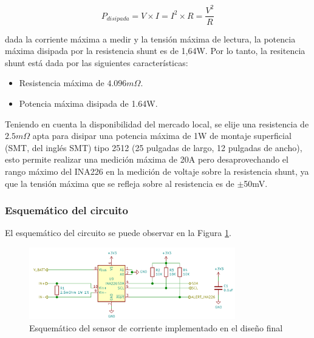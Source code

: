 \documentclass[10pt,a4paper]{article}
\begin{document}
\begin{itemize}
\begin{equation}
    P_{disipada} = V \times I = I^2 \times R = \frac{V^2}{R} \label{calc_pot_res}
\end{equation}

dada la corriente m\'axima a medir y la tensi\'on m\'axima de lectura, la
potencia m\'axima disipada por la resistencia shunt es de 1,64W. Por lo tanto,
la resitencia shunt est\'a dada por las siguientes caracter\'isticas:

\begin{itemize}
    \item Resistencia m\'axima de $4.096m\Omega$.
    \item Potencia m\'axima disipada de 1.64W.
\end{itemize}

Teniendo en cuenta la disponibilidad del mercado local, se elije una resistencia 
de $2.5m\Omega$ apta para disipar una potencia m\'axima de 1W de montaje
superficial (\acrshort{SMT}, del ingl\'es \acrlong{SMT}) tipo 2512 
(25 pulgadas de largo, 12 pulgadas de ancho), esto permite realizar una
medici\'on m\'axima de 20A pero desaprovechando el rango m\'aximo del INA226 en
la medici\'on de voltaje sobre la resistencia shunt, ya que la tensi\'on
m\'axima que se refleja sobre al resistencia es de $\mathrm{\pm}$50mV.

\subsubsection{Esquem\'atico del circuito}

El esquem\'atico del circuito se puede observar en la Figura \ref{ina226_sch}.

\begin{figure}[h!]
    \begin{center}
        \includegraphics[width=0.8\textwidth]{ina226_sch.png}
        \caption{Esquem\'atico del sensor de corriente implementado en el diseño
                 final}
        \label{ina226_sch}
    \end{center}
\end{figure}


\end{itemize}
\end{document}
